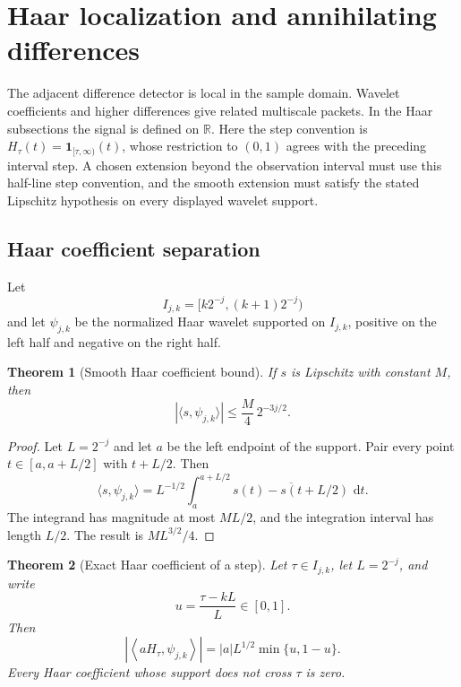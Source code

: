 \documentclass[11pt,letterpaper]{article}
\newtheorem{theorem}{Theorem}[section]
\theoremstyle{plain}
\theoremstyle{plain}
\theoremstyle{plain}
\theoremstyle{definition}
\theoremstyle{definition}
\theoremstyle{definition}
\theoremstyle{definition}
\theoremstyle{remark}
\theoremstyle{remark}
\theoremstyle{remark}
\theoremstyle{remark}
\newcommand{\RR}{\mathbb R}
\newcommand{\one}{\mathbf 1}
\newcommand{\dd}{\,\mathrm d}
\begin{document}
\section{Haar localization and annihilating differences}\label{extension:section:10}\label{sec:localization}

The adjacent difference detector is local in the sample domain. Wavelet coefficients and higher differences give related multiscale packets. In the Haar subsections the signal is defined on \(\RR\). Here the step convention is \(H_\tau(t)=\one_{[\tau,\infty)}(t)\), whose restriction to \((0,1)\) agrees with the preceding interval step. A chosen extension beyond the observation interval must use this half-line step convention, and the smooth extension must satisfy the stated Lipschitz hypothesis on every displayed wavelet support.

\subsection{Haar coefficient separation}

Let
\[
I_{j,k}
=
[k2^{-j},(k+1)2^{-j})
\]
and let \(\psi_{j,k}\) be the normalized Haar wavelet supported on \(I_{j,k}\), positive on the left half and negative on the right half.

\begin{theorem}[Smooth Haar coefficient bound]\label{thm:smooth_haar_bound}
If \(s\) is Lipschitz with constant \(M\), then
\[
|\langle s,\psi_{j,k}\rangle|
\leq
\frac M4\,2^{-3j/2}.
\]
\end{theorem}

\begin{proof}
Let \(L=2^{-j}\) and let \(a\) be the left endpoint of the support. Pair every point \(t\in[a,a+L/2]\) with \(t+L/2\). Then
\[
\langle s,\psi_{j,k}\rangle
=
L^{-1/2}
\int_a^{a+L/2}
\overline{s(t)-s(t+L/2)}\,\dd t.
\]
The integrand has magnitude at most \(ML/2\), and the integration interval has length \(L/2\). The result is \(ML^{3/2}/4\).
\end{proof}

\begin{theorem}[Exact Haar coefficient of a step]\label{thm:haar_step_coefficient}
Let \(\tau\in I_{j,k}\), let \(L=2^{-j}\), and write
\[
u=\frac{\tau-kL}{L}\in[0,1].
\]
Then
\[
\left|
\left\langle
 aH_\tau,\psi_{j,k}
\right\rangle
\right|
=
|a|L^{1/2}\min\{u,1-u\}.
\]
Every Haar coefficient whose support does not cross \(\tau\) is zero.
\end{theorem}
\end{document}
